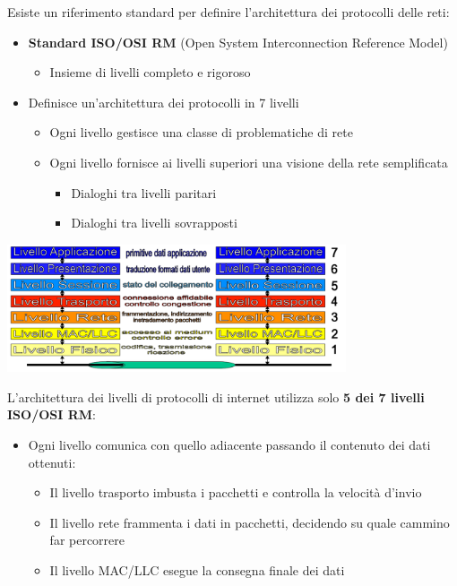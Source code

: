 \documentclass{article}
\begin{document}
Esiste un riferimento standard per definire l'architettura dei protocolli delle reti:
\begin{itemize}
    \item \textbf{Standard ISO/OSI RM} (Open System Interconnection Reference Model)
    \begin{itemize}
        \item Insieme di livelli completo e rigoroso
    \end{itemize}
    \item Definisce un'architettura dei protocolli in 7 livelli
    \begin{itemize}
        \item Ogni livello gestisce una classe di problematiche di rete
        \item Ogni livello fornisce ai livelli superiori una visione della rete semplificata
        \begin{itemize}
            \item Dialoghi tra livelli paritari
            \item Dialoghi tra livelli sovrapposti
        \end{itemize}
    \end{itemize}
\end{itemize}

\begin{center}
    \includegraphics[width=10cm]{img/ISO:OSI.png}
\end{center}

L'architettura dei livelli di protocolli di internet utilizza solo   \textbf{5 dei 7 livelli ISO/OSI RM}:
\begin{itemize}
    \item Ogni livello comunica con quello adiacente passando il contenuto dei dati ottenuti:
    \begin{itemize}
        \item Il livello trasporto imbusta i pacchetti e controlla la velocità d'invio
        \item Il livello rete frammenta i dati in pacchetti, decidendo su quale cammino far percorrere
        \item Il livello MAC/LLC esegue la consegna finale dei dati
    \end{itemize}
\end{itemize}
\end{document}
